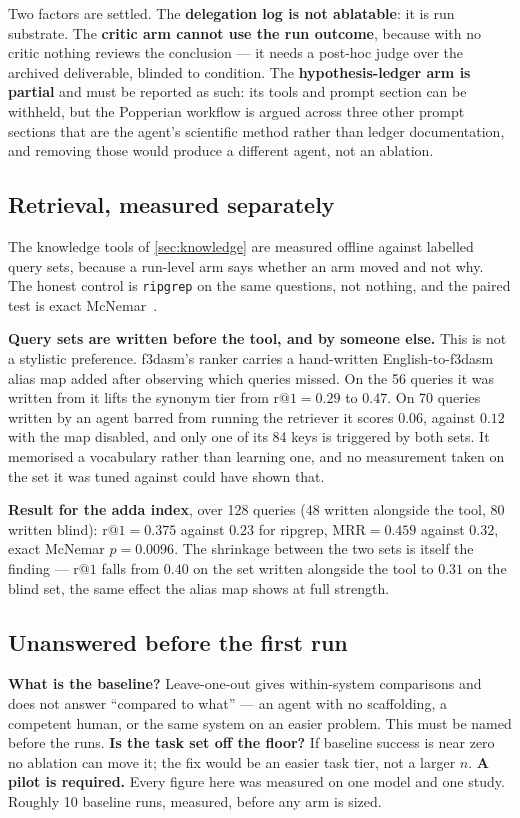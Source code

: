 Two factors are settled. The \textbf{delegation log is not ablatable}: it is
run substrate. The \textbf{critic arm cannot use the run outcome}, because with
no critic nothing reviews the conclusion --- it needs a post-hoc judge over the
archived deliverable, blinded to condition. The \textbf{hypothesis-ledger arm
is partial} and must be reported as such: its tools and prompt section can be
withheld, but the Popperian workflow is argued across three other prompt
sections that are the agent's scientific method rather than ledger
documentation, and removing those would produce a different agent, not an
ablation.

\subsection{Retrieval, measured separately}
\label{sec:retrieval-eval}

The knowledge tools of \cref{sec:knowledge} are measured offline against
labelled query sets, because a run-level arm says whether an arm moved and not
why. The honest control is \texttt{ripgrep} on the same questions, not nothing,
and the paired test is exact McNemar~\cite{mcnemar1947}.

\textbf{Query sets are written before the tool, and by someone else.} This is
not a stylistic preference. f3dasm's ranker carries a hand-written
English-to-f3dasm alias map added after observing which queries missed. On the
56 queries it was written from it lifts the synonym tier from
$\mathrm{r@}1=0.29$ to $0.47$. On 70 queries written by an agent barred from
running the retriever it scores $0.06$, against $0.12$ with the map disabled,
and only one of its 84 keys is triggered by both sets. It memorised a
vocabulary rather than learning one, and no measurement taken on the set it was
tuned against could have shown that.

\textbf{Result for the adda index}, over 128 queries (48 written alongside the
tool, 80 written blind): $\mathrm{r@}1 = 0.375$ against $0.23$ for ripgrep,
$\mathrm{MRR} = 0.459$ against $0.32$, exact McNemar $p = 0.0096$. The
shrinkage between the two sets is itself the finding --- $\mathrm{r@}1$ falls
from $0.40$ on the set written alongside the tool to $0.31$ on the blind set,
the same effect the alias map shows at full strength.

\subsection{Unanswered before the first run}

\textbf{What is the baseline?} Leave-one-out gives within-system comparisons
and does not answer ``compared to what'' --- an agent with no scaffolding, a
competent human, or the same system on an easier problem. This must be named
before the runs.
\textbf{Is the task set off the floor?} If baseline success is near zero no
ablation can move it; the fix would be an easier task tier, not a larger $n$.
\textbf{A pilot is required.} Every figure here was measured on one model and
one study. Roughly 10 baseline runs, measured, before any arm is sized.
